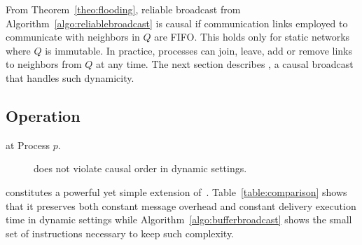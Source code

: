 From Theorem~\ref{theo:flooding}, reliable broadcast from
Algorithm~\ref{algo:reliablebroadcast} is causal if communication links employed
to communicate with neighbors in $Q$ are FIFO. This holds only for static
networks where $Q$ is immutable. In practice, processes can join, leave, add or
remove links to neighbors from $Q$ at any time. The next section describes
\CBROADCAST, a causal broadcast that handles such dynamicity.


\subsection{Operation}

\begin{algorithm}[h]
  
  \caption{\label{algo:bufferbroadcast}\CBROADCAST at Process $p$.}
\end{algorithm}

\begin{figure*}
  \begin{center}
    \hspace{20pt}
    \hspace{20pt}
    \hspace{20pt}
    \hspace{20pt}
    \caption{\label{fig:preventivesolve}\CBROADCAST does not violate causal
      order in dynamic settings.}
  \end{center}
\end{figure*}

\CBROADCAST constitutes a powerful yet simple extension
of~\cite{friedman2004causal}. Table~\ref{table:comparison} shows that it
preserves both constant message overhead and constant delivery execution time in
dynamic settings while Algorithm~\ref{algo:bufferbroadcast} shows the small set
of instructions necessary to keep such complexity.

